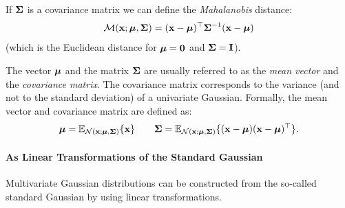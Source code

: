 
If $\boldsymbol{\mathbf{\Sigma}}$ is a covariance matrix we can define the \textit{Mahalanobis} distance:
\begin{equation}
\mathcal{M}(\boldsymbol{\mathbf{x}};\boldsymbol{\mathbf{\mu}},\boldsymbol{\mathbf{\Sigma}}) = (\boldsymbol{\mathbf{x}}-\boldsymbol{\mathbf{\mu}})^\top\boldsymbol{\mathbf{\Sigma}}^{-1}(\boldsymbol{\mathbf{x}}-\boldsymbol{\mathbf{\mu}})
\end{equation}
(which is the Euclidean distance for $\boldsymbol{\mathbf{\mu}}=\boldsymbol{\mathbf{0}}$ and $\boldsymbol{\mathbf{\Sigma}}=\boldsymbol{\mathbf{I}}$).\\


The vector $\boldsymbol{\mathbf{\mu}}$ and the matrix $\boldsymbol{\mathbf{\Sigma}}$ are usually referred to as the \textit{mean vector} and the \textit{covariance matrix}. The covariance matrix corresponds to the variance (and not to the standard deviation) of a univariate Gaussian. Formally, the mean vector and covariance matrix are defined as:
\begin{equation}
 \boldsymbol{\mathbf{\mu}} = \mathbb{E}_{\mathcal{N}(\boldsymbol{\mathbf{x}};\boldsymbol{\mathbf{\mu}},\boldsymbol{\mathbf{\Sigma}})}\{\mathbf{x}\} \qquad \boldsymbol{\mathbf{\Sigma}} = \mathbb{E}_{\mathcal{N}(\boldsymbol{\mathbf{x}};\boldsymbol{\mathbf{\mu}},\boldsymbol{\mathbf{\Sigma}})}\{(\mathbf{x}-\boldsymbol{\mathbf{\mu}})(\mathbf{x}-\boldsymbol{\mathbf{\mu}})^\top\}.
\end{equation}



\paragraph{As Linear Transformations of the Standard Gaussian} Multivariate Gaussian distributions can be constructed from the so-called standard Gaussian by using linear transformations.\vspace{2mm}

